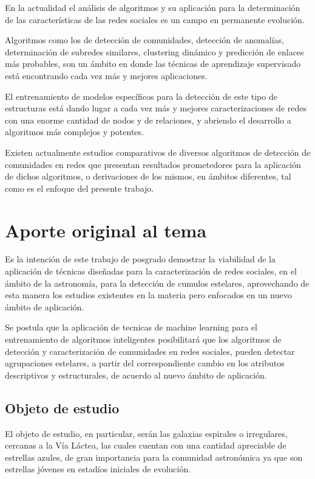 \documentclass[
	11pt,oneside,a4paper,
	headsepline,footsepline,plainfootsepline,plainheadsepline,
	fleqn,
]{article}
\begin{document}
En la actualidad el análisis de algoritmos y su aplicación para la determinación de las características de las redes sociales es un campo en permanente evolución.

Algoritmos como los de detección de comunidades\cite{wang2015review}, detección de anomalías\cite{kaur2016survey}, determinación de subredes similares, clustering dinámico\cite{boccaletti2007detecting} y predicción de enlaces más probables\cite{kushwah2016review}, son un ámbito en donde las técnicas de aprendizaje supervisado está encontrando cada vez más y mejores aplicaciones.

El entrenamiento de modelos específicos para la detección de este tipo de estructuras está dando lugar a cada vez más y mejores caracterizaciones de redes con una enorme cantidad de nodos y de relaciones, y abriendo el desarrollo a algoritmos más complejos y potentes.

Existen actualmente estudios comparativos de diversos algoritmos de detección de comunidades en redes \cite{PhysRevE.80.056117} que presentan resultados prometedores para la aplicación de dichos algoritmos, o derivaciones de los mismos, en ámbitos diferentes, tal como es el enfoque del presente trabajo.


\section{Aporte original al tema}

Es la intención de este trabajo de posgrado demostrar la viabilidad de la aplicación de técnicas diseñadas para la caracterización de redes sociales, en el ámbito de la astronomía, para la detección de cumulos estelares, aprovechando de esta manera los estudios existentes en la materia pero enfocados en un nuevo ámbito de aplicación.

Se postula que la aplicación de tecnicas de machine learning para el entrenamiento de algoritmos inteligentes posibilitará que los algoritmos de detección y caracterización de comunidades en redes sociales, pueden detectar agrupaciones estelares, a partir del correspondiente cambio en los atributos descriptivos y estructurales, de acuerdo al nuevo ámbito de aplicación.

\subsection*{Objeto de estudio}

El objeto de estudio, en particular, serán las galaxias espirales o irregulares, cercanas a la Vía Láctea, las cuales cuentan con una cantidad apreciable de estrellas azules, de gran importancia para la comunidad astronómica ya que son estrellas jóvenes en estadíos iniciales de evolución.
\end{document}
